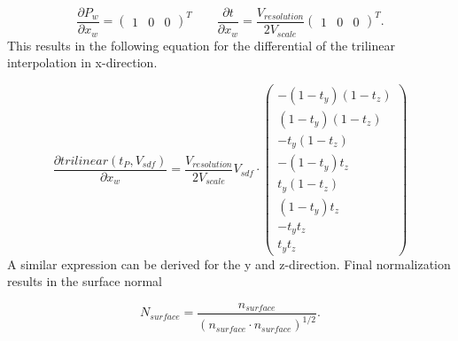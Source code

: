 \documentclass[12pt]{article}
\newcommand{\pardiff}[2]{\frac{\partial #1}{\partial #2} }
\newcommand{\newlinel}{\\[0.3em]}
\begin{document}
\begin{equation}
\pardiff{P_w}{x_w} = 
\begin{pmatrix}
1 & 0 & 0
\end{pmatrix}^T
\qquad
\pardiff{t}{x_w} = 
\frac{V_{resolution}}{2V_{scale}}
\begin{pmatrix}
1 & 0 & 0
\end{pmatrix}^T.
\end{equation}
This results in the following equation for the differential of the trilinear interpolation in x-direction.

\begin{equation}
\pardiff{trilinear(t_P, V_{sdf})}{x_{w}} = 
\frac{V_{resolution}}{2V_{scale}}
V_{sdf} \cdot
\begin{pmatrix}
-(1 - t_y) (1 - t_z) \newlinel
(1 - t_y) (1 - t_z) \newlinel
-t_y (1 - t_z) \newlinel
-(1 - t_y) t_z \newlinel
t_y (1 - t_z) \newlinel
(1 - t_y) t_z \newlinel
-t_y t_z \newlinel
t_y t_z
\end{pmatrix}
\end{equation}
A similar expression can be derived for the y and z-direction. Final normalization results in the surface normal

\begin{equation}
N_{surface} = \frac{n_{surface}}{\left(n_{surface} \cdot n_{surface}\right)^{1/2}} .
\end{equation}
\end{document}

